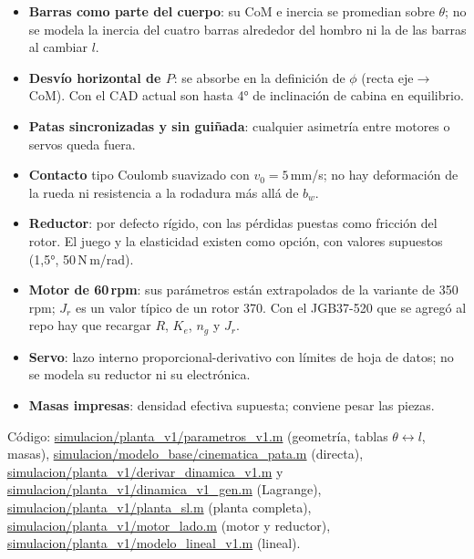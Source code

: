 \documentclass[11pt,a4paper]{article}
\begin{document}
\begin{itemize}\itemsep2pt
  \item \textbf{Barras como parte del cuerpo}: su CoM e inercia se promedian sobre $\theta$; no se
  modela la inercia del cuatro barras alrededor del hombro ni la de las barras al cambiar $l$.
  \item \textbf{Desvío horizontal de $P$}: se absorbe en la definición de $\phi$ (recta eje$\to$CoM).
  Con el CAD actual son hasta 4° de inclinación de cabina en equilibrio.
  \item \textbf{Patas sincronizadas y sin guiñada}: cualquier asimetría entre motores o servos queda fuera.
  \item \textbf{Contacto} tipo Coulomb suavizado con $v_0 = 5$\,mm/s; no hay deformación de la rueda ni
  resistencia a la rodadura más allá de $b_w$.
  \item \textbf{Reductor}: por defecto rígido, con las pérdidas puestas como fricción del rotor. El juego
  y la elasticidad existen como opción, con valores supuestos (1{,}5°, 50\,N\,m/rad).
  \item \textbf{Motor de 60\,rpm}: sus parámetros están extrapolados de la variante de 350\,rpm; $J_r$
  es un valor típico de un rotor 370. Con el JGB37-520 que se agregó al repo hay que recargar $R$,
  $K_e$, $n_g$ y $J_r$.
  \item \textbf{Servo}: lazo interno proporcional-derivativo con límites de hoja de datos; no se modela su
  reductor ni su electrónica.
  \item \textbf{Masas impresas}: densidad efectiva supuesta; conviene pesar las piezas.
\end{itemize}

\vspace{6pt}
\small Código: \url{simulacion/planta_v1/parametros_v1.m} (geometría, tablas $\theta \leftrightarrow l$, masas),
\url{simulacion/modelo_base/cinematica_pata.m} (directa), \url{simulacion/planta_v1/derivar_dinamica_v1.m} y
\url{simulacion/planta_v1/dinamica_v1_gen.m} (Lagrange), \url{simulacion/planta_v1/planta_sl.m} (planta completa),
\url{simulacion/planta_v1/motor_lado.m} (motor y reductor), \url{simulacion/planta_v1/modelo_lineal_v1.m} (lineal).
\end{document}
